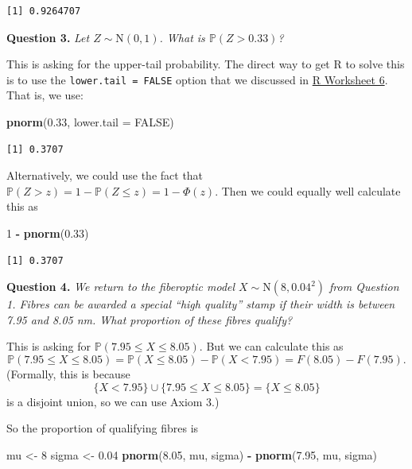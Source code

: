 \documentclass[
  a4paper,
]{book}
\newenvironment{Shaded}{\begin{snugshade}}{\end{snugshade}}
\newcommand{\AttributeTok}[1]{\textcolor[rgb]{0.13,0.29,0.53}{#1}}
\newcommand{\ConstantTok}[1]{\textcolor[rgb]{0.56,0.35,0.01}{#1}}
\newcommand{\DecValTok}[1]{\textcolor[rgb]{0.00,0.00,0.81}{#1}}
\newcommand{\FloatTok}[1]{\textcolor[rgb]{0.00,0.00,0.81}{#1}}
\newcommand{\FunctionTok}[1]{\textcolor[rgb]{0.13,0.29,0.53}{\textbf{#1}}}
\newcommand{\NormalTok}[1]{#1}
\newcommand{\OtherTok}[1]{\textcolor[rgb]{0.56,0.35,0.01}{#1}}
\newcommand{\SpecialCharTok}[1]{\textcolor[rgb]{0.81,0.36,0.00}{\textbf{#1}}}
\theoremstyle{definition}
\theoremstyle{definition}
\theoremstyle{definition}
\theoremstyle{definition}
\theoremstyle{remark}
\begin{document}
\begin{verbatim}
[1] 0.9264707
\end{verbatim}

\textbf{Question 3.} \emph{Let \(Z \sim \mathrm{N}(0,1)\). What is \(\mathbb P(Z > 0.33)\)?}

This is asking for the upper-tail probability. The direct way to get R to solve this is to use the \texttt{lower.tail\ =\ FALSE} option that we discussed in \protect\hyperlink{r}{R Worksheet 6}. That is, we use:

\begin{Shaded}
\begin{Highlighting}[]
\FunctionTok{pnorm}\NormalTok{(}\FloatTok{0.33}\NormalTok{, }\AttributeTok{lower.tail =} \ConstantTok{FALSE}\NormalTok{)}
\end{Highlighting}
\end{Shaded}

\begin{verbatim}
[1] 0.3707
\end{verbatim}

Alternatively, we could use the fact that \(\mathbb P(Z > z) = 1 - \mathbb P(Z \leq z) = 1 - \Phi(z)\). Then we could equally well calculate this as

\begin{Shaded}
\begin{Highlighting}[]
\DecValTok{1} \SpecialCharTok{{-}} \FunctionTok{pnorm}\NormalTok{(}\FloatTok{0.33}\NormalTok{)}
\end{Highlighting}
\end{Shaded}

\begin{verbatim}
[1] 0.3707
\end{verbatim}

\textbf{Question 4.} \emph{We return to the fiberoptic model \(X \sim \mathrm{N}(8, 0.04^2)\) from Question 1. Fibres can be awarded a special ``high quality'' stamp if their width is between 7.95 and 8.05 nm. What proportion of these fibres qualify?}

This is asking for \(\mathbb P(7.95 \leq X \leq 8.05)\). But we can calculate this as
\[ \mathbb P(7.95 \leq X \leq 8.05) = \mathbb P(X \leq 8.05) - \mathbb P(X < 7.95) = F(8.05) - F(7.95) .\]
(Formally, this is because
\[ \{X < 7.95\} \cup \{7.95 \leq X \leq 8.05\} = \{X \leq 8.05\} \]
is a disjoint union, so we can use Axiom 3.)

So the proportion of qualifying fibres is

\begin{Shaded}
\begin{Highlighting}[]
\NormalTok{mu }\OtherTok{\textless{}{-}} \DecValTok{8}
\NormalTok{sigma }\OtherTok{\textless{}{-}} \FloatTok{0.04}
\FunctionTok{pnorm}\NormalTok{(}\FloatTok{8.05}\NormalTok{, mu, sigma) }\SpecialCharTok{{-}} \FunctionTok{pnorm}\NormalTok{(}\FloatTok{7.95}\NormalTok{, mu, sigma)}
\end{Highlighting}
\end{Shaded}
\end{document}
